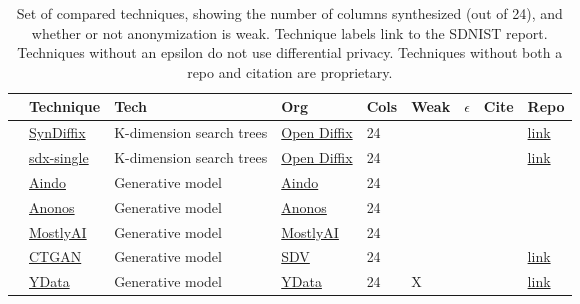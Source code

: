 \begin{table}
    \centering
    \caption{Set of compared techniques, showing the number of columns synthesized (out of 24), and whether or not anonymization is weak. Technique labels link to the SDNIST report. Techniques without an epsilon do not use differential privacy. Techniques without both a repo and citation are proprietary.}
    \label{tab:infotable}
    \begin{tabular}{lllllllll}
        \toprule
          & Technique & Tech & Org & Cols & Weak & \thinspace$\epsilon$\qquad\qquad & Cite & Repo \\
        \midrule
        \cellcolor{blue} & \href{https://htmlpreview.github.io/?https://github.com/yoid2000/sdnist-summary/blob/main/results/syndiffix_all/report.html}{SynDiffix} & K-dimension search trees & \href{https://www.open-diffix.org/}{Open Diffix} & 24 &   &  & \cite{francis2023syndiffix} & \href{https://github.com/diffix/syndiffix}{link} \\
        \cellcolor{blue} & \href{https://htmlpreview.github.io/?https://github.com/yoid2000/sdnist-summary/blob/main/results/sdx-single/report.html}{sdx-single} & K-dimension search trees & \href{https://www.open-diffix.org/}{Open Diffix} & 24 &   &  & \cite{francis2023syndiffix} & \href{https://github.com/diffix/syndiffix}{link} \\
        \cellcolor{red} & \href{https://htmlpreview.github.io/?https://github.com/yoid2000/sdnist-summary/blob/main/results/aindo_synth/report.html}{Aindo} & Generative model & \href{https://www.aindo.com/}{Aindo} & 24 &   &  &  &  \\
        \cellcolor{red} & \href{https://htmlpreview.github.io/?https://github.com/yoid2000/sdnist-summary/blob/main/results/anonos_sdk/report.html}{Anonos} & Generative model & \href{https://www.anonos.com/}{Anonos} & 24 &   &  &  &  \\
        \cellcolor{red} & \href{https://htmlpreview.github.io/?https://github.com/yoid2000/sdnist-summary/blob/main/results/mostlyai_sd_platform/report.html}{MostlyAI} & Generative model & \href{https://mostly.ai/}{MostlyAI} & 24 &   &  &  &  \\
        \cellcolor{red} & \href{https://htmlpreview.github.io/?https://github.com/yoid2000/sdnist-summary/blob/main/results/sdv_ctgan_epochs1000/report.html}{CTGAN} & Generative model & \href{https://sdv.dev/}{SDV} & 24 &   &  & \cite{xu2019modeling} & \href{https://github.com/sdv-dev/SDV}{link} \\
        \cellcolor{pink} & \href{https://htmlpreview.github.io/?https://github.com/yoid2000/sdnist-summary/blob/main/results/ydata_fabric_synthesizers/report.html}{YData} & Generative model & \href{https://ydata.ai/}{YData} & 24 & X &  &  & \href{https://github.com/ydataai/ydata-synthetic}{link} \\

\end{tabular}
\end{table}
